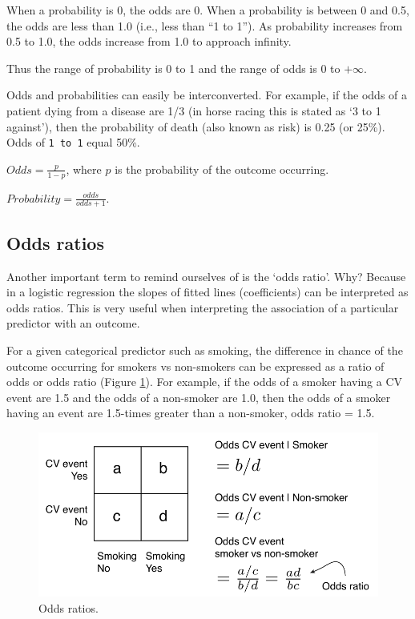 \documentclass[
  12pt,
  krantz2]{krantz}
\begin{document}
When a probability is 0, the odds are 0.
When a probability is between 0 and 0.5, the odds are less than 1.0 (i.e., less than ``1 to 1'').
As probability increases from 0.5 to 1.0, the odds increase from 1.0 to approach infinity.

Thus the range of probability is 0 to 1 and the range of odds is 0 to \(+\infty\).

Odds and probabilities can easily be interconverted.
For example, if the odds of a patient dying from a disease are 1/3 (in horse racing this is stated as `3 to 1 against'), then the probability of death (also known as risk) is 0.25 (or 25\%).
Odds of \texttt{1\ to\ 1} equal 50\%.

\(Odds = \frac{p}{1-p}\), where \(p\) is the probability of the outcome occurring.

\(Probability = \frac{odds}{odds+1}\).

\hypertarget{odds-ratios}{%
\subsection{Odds ratios}\label{odds-ratios}}


Another important term to remind ourselves of is the `odds ratio'.
Why?
Because in a logistic regression the slopes of fitted lines (coefficients) can be interpreted as odds ratios.
This is very useful when interpreting the association of a particular predictor with an outcome.

For a given categorical predictor such as smoking, the difference in chance of the outcome occurring for smokers vs non-smokers can be expressed as a ratio of odds or odds ratio (Figure \ref{fig:chap09-fig-or}).
For example, if the odds of a smoker having a CV event are 1.5 and the odds of a non-smoker are 1.0, then the odds of a smoker having an event are 1.5-times greater than a non-smoker, odds ratio = 1.5.

\begin{figure}
\centering
\includegraphics{images/chapter09/1_or.pdf}
\caption{\label{fig:chap09-fig-or}Odds ratios.}
\end{figure}
\end{document}

